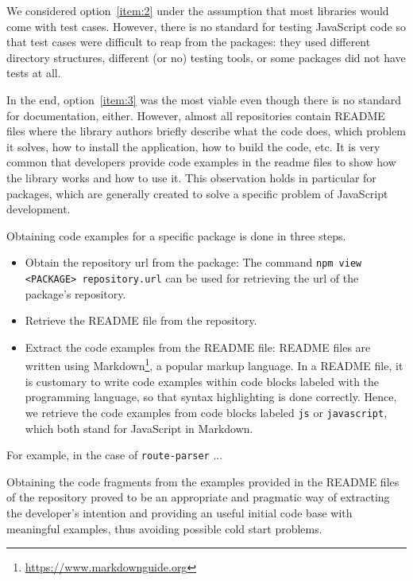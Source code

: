 \documentclass[a4paper,english,cleveref, autoref]{lipics-v2019}
\begin{document}
We considered option~\ref{item:2} under the assumption that most
libraries would come with test cases. However, there is no standard
for testing JavaScript code so that test cases were difficult to reap
from the \NPM{} packages: they used different directory structures,
different (or no) testing tools, or some packages did not have tests
at all.

In the end, option~\ref{item:3} was the most viable even though there
is no standard for documentation, either. However, almost all repositories
contain README files where the library authors briefly describe what
the code does, which problem it solves, how to install the
application, how to build the code, etc. It is very common that
developers provide code examples in the readme files to show how the
library works and how to use it. This observation holds in particular
for \NPM{} packages, which are generally created to solve a specific
problem of JavaScript development. 


Obtaining code examples for a specific \NPM{} package is done in three steps.
\begin{itemize}
\item Obtain the repository url from the package: The command
  \texttt{npm view <PACKAGE> repository.url} can be used for
  retrieving the url of the package's repository. 

\item Retrieve the README file from the repository.

\item Extract the code examples from the README file: README files are
  written using Markdown\footnote{\url{https://www.markdownguide.org}}, a
  popular markup language. In a README file, it is customary to write
  code examples within code blocks labeled with the programming
  language, so that syntax highlighting is done correctly. Hence, we
  retrieve the code examples from code blocks labeled \texttt{js} or
  \texttt{javascript}, which both stand for JavaScript in
  Markdown.
\end{itemize}

For example, in the case of \texttt{route-parser} ...

Obtaining the code fragments from the examples provided in the
README files of the repository proved to be an
appropriate and pragmatic way of extracting the developer's
intention and providing an useful initial code base with meaningful
examples, thus avoiding possible cold start problems.
\end{document}
